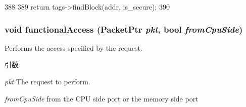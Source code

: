 \begin{DoxyCode}
388                                                          {
389         return tags->findBlock(addr, is_secure);
390     }
\end{DoxyCode}
\hypertarget{classCache_ae764e8af8ed82d5b1e78530e56a16470}{
\subsubsection[{functionalAccess}]{\setlength{\rightskip}{0pt plus 5cm}void functionalAccess ({\bf PacketPtr} {\em pkt}, \/  bool {\em fromCpuSide})}}
\label{classCache_ae764e8af8ed82d5b1e78530e56a16470}
Performs the access specified by the request. 
\begin{DoxyParams}{引数}
\item[{\em pkt}]The request to perform. \item[{\em fromCpuSide}]from the CPU side port or the memory side port \end{DoxyParams}



